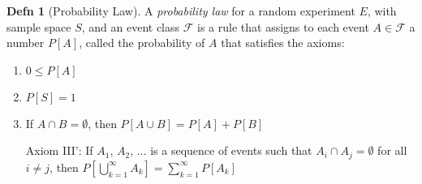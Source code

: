 \documentclass[10pt,letterpaper,final,twoside,notitlepage]{article}
\theoremstyle{plain}
\theoremstyle{definition}
\newtheorem{definition}{Defn}
\begin{document}
	\begin{definition}[Probability Law] \label{def:Probability Law}
		A \emph{probability law} for a random experiment $E$, with sample space $S$, and an event class $\mathcal{F}$ is a rule that assigns to each event $A \in \mathcal{F}$ a number $P \left[A \right]$, called the probability of $A$ that satisfies the axioms:
		\begin{enumerate}[label=Axiom~\Roman*:, align=left, noitemsep, nolistsep] \label{subdef:Probability Law Axioms}
			\item $0 \leq P\left[ A \right]$
			\item $P \left[ S \right] = 1$
			\item If $A \cap B = \emptyset$, then $P \left[ A \cup B \right] = P \left[ A \right] + P \left[ B \right]$
			\item[Axiom III':] If $A_{1}$, $A_{2}$, $\ldots$ is a sequence of events such that $A_{i} \cap A_{j} = \emptyset$ for all $i \neq j$, then $P \left[ \bigcup_{k=1}^{\infty} A_{k} \right] = \sum_{k=1}^{\infty} P \left[ A_{k} \right]$
		\end{enumerate}
	\end{definition}
	
\end{document}
